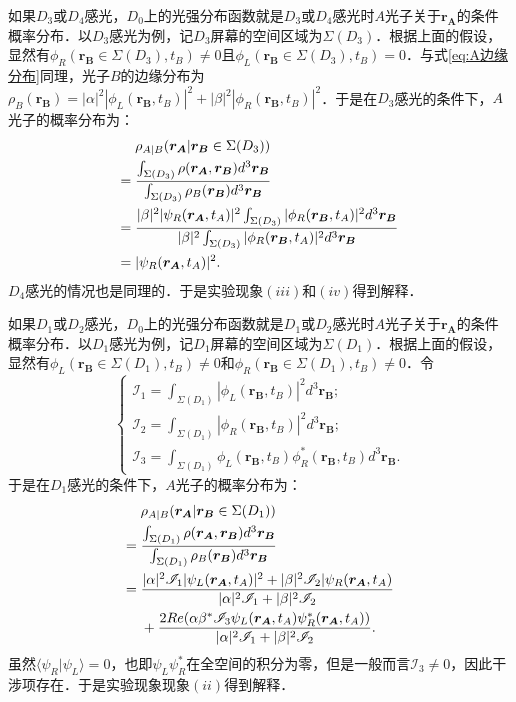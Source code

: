 如果$D_3$或$D_4$感光，$D_0$上的光强分布函数就是$D_3$或$D_4$感光时$A$光子关于$\boldsymbol{r_A}$的条件概率分布．以$D_3$感光为例，记$D_3$屏幕的空间区域为$\Sigma(D_3)$．根据上面的假设，显然有$\phi_R(\boldsymbol{r_B}\in\Sigma(D_3),t_B)\neq 0$且$\phi_L(\boldsymbol{r_B}\in\Sigma(D_3),t_B)=0$．与式\ref{eq:A边缘分布}同理，光子$B$的边缘分布为$\rho_B(\boldsymbol{r_B})=|\alpha|^2|\phi_L(\boldsymbol{r_B},t_B)|^2+|\beta|^2|\phi_R(\boldsymbol{r_B},t_B)|^2$．于是在$D_3$感光的条件下，$A$光子的概率分布为：
\begin{align}
&\rho_{A|B}(\boldsymbol{r_A}|\boldsymbol{r_B}\in\Sigma(D_3)) \notag \\
={}&\frac{\int_{\Sigma(D_3)}\rho(\boldsymbol{r_A},\boldsymbol{r_B})d^3\boldsymbol{r_B}}{\int_{\Sigma(D_3)}\rho_B(\boldsymbol{r_B})d^3\boldsymbol{r_B}} \notag \\
={}&\frac{|\beta|^2|\psi_R(\boldsymbol{r_A},t_A)|^2\int_{\Sigma(D_3)}|\phi_R(\boldsymbol{r_B},t_A)|^2d^3\boldsymbol{r_B}}{|\beta|^2\int_{\Sigma(D_3)}|\phi_R(\boldsymbol{r_B},t_A)|^2d^3\boldsymbol{r_B}} \notag \\
={}&|\psi_R(\boldsymbol{r_A},t_A)|^2.
\end{align}
$D_4$感光的情况也是同理的．于是实验现象$(iii)$和$(iv)$得到解释．

如果$D_1$或$D_2$感光，$D_0$上的光强分布函数就是$D_1$或$D_2$感光时$A$光子关于$\boldsymbol{r_A}$的条件概率分布．以$D_1$感光为例，记$D_1$屏幕的空间区域为$\Sigma(D_1)$．根据上面的假设，显然有$\phi_L(\boldsymbol{r_B}\in\Sigma(D_1),t_B)\neq 0$和$\phi_R(\boldsymbol{r_B}\in\Sigma(D_1),t_B)\neq 0$．令
\begin{equation}
	\begin{cases}
	\mathscr{I}_1=\int_{\Sigma(D_1)}|\phi_L(\boldsymbol{r_B},t_B)|^2d^3\boldsymbol{r_B}; \\
	\mathscr{I}_2=\int_{\Sigma(D_1)}|\phi_R(\boldsymbol{r_B},t_B)|^2d^3\boldsymbol{r_B}; \\
	\mathscr{I}_3=\int_{\Sigma(D_1)}\phi_L(\boldsymbol{r_B},t_B)\phi_R^*(\boldsymbol{r_B},t_B)d^3\boldsymbol{r_B}.
	\end{cases}
\end{equation}
于是在$D_1$感光的条件下，$A$光子的概率分布为：
\begin{align}
&\rho_{A|B}(\boldsymbol{r_A}|\boldsymbol{r_B}\in\Sigma(D_1)) \notag \\
={}&\frac{\int_{\Sigma(D_1)}\rho(\boldsymbol{r_A},\boldsymbol{r_B})d^3\boldsymbol{r_B}}{\int_{\Sigma(D_1)}\rho_B(\boldsymbol{r_B})d^3\boldsymbol{r_B}} \notag \\
={}&\frac{|\alpha|^2\mathscr{I}_1|\psi_L(\boldsymbol{r_A},t_A)|^2+|\beta|^2\mathscr{I}_2|\psi_R(\boldsymbol{r_A},t_A)}{|\alpha|^2\mathscr{I}_1+|\beta|^2\mathscr{I}_2} \notag \\
&+\frac{2Re(\alpha\beta^*\mathscr{I}_3\psi_L(\boldsymbol{r_A},t_A)\psi_R^*(\boldsymbol{r_A},t_A))}{|\alpha|^2\mathscr{I}_1+|\beta|^2\mathscr{I}_2}.
\end{align}
虽然$\langle\psi_R|\psi_L\rangle=0$，也即$\psi_L\psi_R^*$在全空间的积分为零，但是一般而言$\mathscr{I}_3\neq 0$，因此干涉项存在．于是实验现象现象$(ii)$得到解释．


